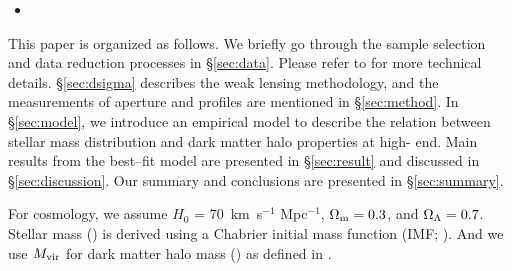 \documentclass[a4paper,fleqn,usenatbib]{mnras}
\begin{document}
\begin{itemize}
        \item {}

    \end{itemize}



    This paper is organized as follows.
    We briefly go through the sample selection and data reduction processes in
    \S \ref{sec:data}.
    Please refer to  for more technical details.
    \S \ref{sec:dsigma} describes the weak lensing methodology, and the
    measurements of aperture \mstar{} and \mden{} profiles are mentioned in
    \S \ref{sec:method}.
    In \S \ref{sec:model}, we introduce an empirical model to describe the relation
    between stellar mass distribution and dark matter halo properties at
    high-\mstar{} end.
    Main results from the best--fit model are presented in \S \ref{sec:result} and
    discussed in \S \ref{sec:discussion}.
    Our summary and conclusions are presented in \S \ref{sec:summary}.


    For cosmology, we assume $H_0$ = 70~km~s$^{-1}$ Mpc$^{-1}$,
    ${\Omega}_{\rm m}=0.3$, and ${\Omega}_{\rm \Lambda}=0.7$.
    Stellar mass (\mstar{}) is derived using a Chabrier initial mass function
    (IMF; \citealt{Chabrier2003}).
    And we use $M_{\rm vir}$ for dark matter halo mass (\mhalo{}) as
    defined in \citealt{BryanNorman1998}.
\end{document}
